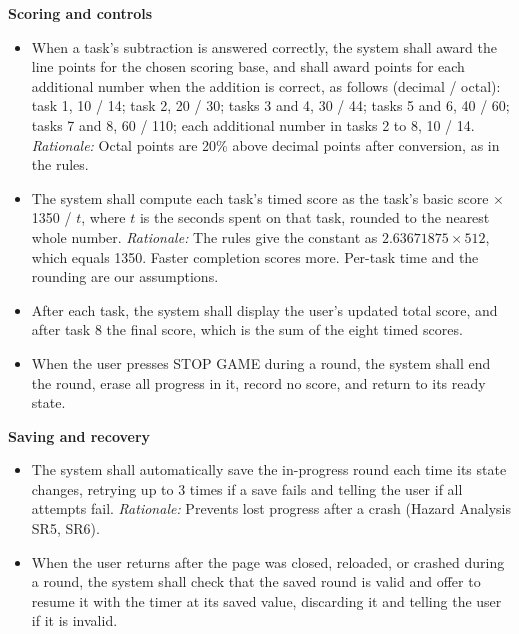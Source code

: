 \documentclass[12pt]{article}
\newcounter{reqnum} %
\begin{document}
\noindent \textbf{Scoring and controls}
\begin{itemize}
 
\item[FR\refstepcounter{reqnum}\thereqnum \label{FR_BasicPoints}:] When a task's subtraction is answered correctly, the system shall award the line points for the chosen scoring base, and shall award points for each additional number when the addition is correct, as follows (decimal / octal): task 1, 10 / 14; task 2, 20 / 30; tasks 3 and 4, 30 / 44; tasks 5 and 6, 40 / 60; tasks 7 and 8, 60 / 110; each additional number in tasks 2 to 8, 10 / 14. \newline \textit{Rationale:} Octal points are 20\% above decimal points after conversion, as in the rules.
 
\item[FR\refstepcounter{reqnum}\thereqnum \label{FR_TimedScore}:] The system shall compute each task's timed score as the task's basic score $\times$ 1350 / $t$, where $t$ is the seconds spent on that task, rounded to the nearest whole number. \newline \textit{Rationale:} The rules give the constant as $2.63671875 \times 512$, which equals 1350. Faster completion scores more. Per-task time and the rounding are our assumptions.
 
\item[FR\refstepcounter{reqnum}\thereqnum \label{FR_Totals}:] After each task, the system shall display the user's updated total score, and after task 8 the final score, which is the sum of the eight timed scores.
 
\item[FR\refstepcounter{reqnum}\thereqnum \label{FR_StopGame}:] When the user presses STOP GAME during a round, the system shall end the round, erase all progress in it, record no score, and return to its ready state.
 
\end{itemize}
 
\noindent \textbf{Saving and recovery}
\begin{itemize}
 
\item[FR\refstepcounter{reqnum}\thereqnum \label{FR_Autosave}:] The system shall automatically save the in-progress round each time its state changes, retrying up to 3 times if a save fails and telling the user if all attempts fail. \newline \textit{Rationale:} Prevents lost progress after a crash (Hazard Analysis SR5, SR6).
 
\item[FR\refstepcounter{reqnum}\thereqnum \label{FR_Resume}:] When the user returns after the page was closed, reloaded, or crashed during a round, the system shall check that the saved round is valid and offer to resume it with the timer at its saved value, discarding it and telling the user if it is invalid.
 
\end{itemize}
 
\end{document}
